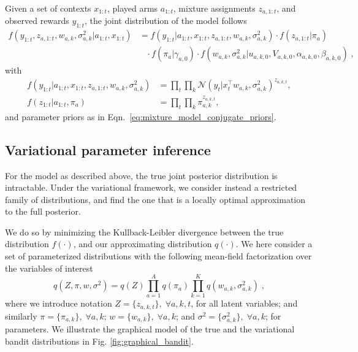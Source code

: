 \documentclass{article}
\newcommand{\N}[1]{\mathcal{N}\left( #1\right)}
\begin{document}
Given a set of contexts $x_{1:t}$, played arms $a_{1:t}$, mixture assignments $z_{a,1:t}$, and observed rewards $y_{1:t}$, the joint distribution of the model follows
\begin{equation}
\begin{split}
f(y_{1:t}, z_{a,1:t}, w_{a,k}, \sigma_{a,k}^2|a_{1:t}, x_{1:t}) & = f(y_{1:t}|a_{1:t}, x_{1:t}, z_{a,1:t}, w_{a,k}, \sigma_{a,k}^2) \cdot f(z_{a,1:t}|\pi_{a}) \\
& \; \; \; \cdot f(\pi_{a}|\gamma_{a,0}) \cdot f(w_{a,k}, \sigma_{a,k}^2|u_{a,k,0}, V_{a,k,0},\alpha_{a,k,0}, \beta_{a,k,0}) \; ,
\end{split}
\end{equation}
with 
\begin{equation}
\begin{split}
f(y_{1:t}|a_{1:t}, x_{1:t}, z_{a,1:t}, w_{a,k}, \sigma_{a,k}^2)  & = \prod_{t} \prod_k \N{y_t|x_t^\top w_{a,k}, \sigma_{a,k}^2}^{z_{a,k,t}},\\
f(z_{1:t}|a_{1:t},\pi_a) &= \prod_t \prod_k \pi_{a,k}^{z_{a,k,t}},
\end{split}
\end{equation}
and parameter priors as in Eqn.~\eqref{eq:mixture_model_conjugate_priors}.

\subsection{Variational parameter inference}
\label{ssec:variational_distribution}

For the model as described above, the true joint posterior distribution is intractable. Under the variational framework, we consider instead a restricted family of distributions, and find the one that is a locally optimal approximation to the full posterior.

We do so by minimizing the Kullback-Leibler divergence between the true distribution $f(\cdot)$, and our approximating distribution $q(\cdot)$. We here consider a set of parameterized distributions with the following mean-field factorization over the variables of interest
\begin{equation}
q(Z, \pi, w, \sigma^2)=q(Z) \prod_{a=1}^A q(\pi_a) \prod_{k=1}^{K} q(w_{a,k}, \sigma_{a,k}^2) \; ,
\label{eq:variational_factorization}
\end{equation}
where we introduce notation $Z=\{z_{a,k,t}\}, \; \forall a,k,t$, for all latent variables; and similarly $\pi=\{\pi_{a,k}\}, \; \forall a,k$; $w=\{w_{a,k}\}, \; \forall a,k$; and $\sigma^2=\{\sigma_{a,k}^2\}, \; \forall a,k$; for parameters. We illustrate the graphical model of the true and the variational bandit distributions in Fig. \ref{fig:graphical_bandit}.
\end{document}
